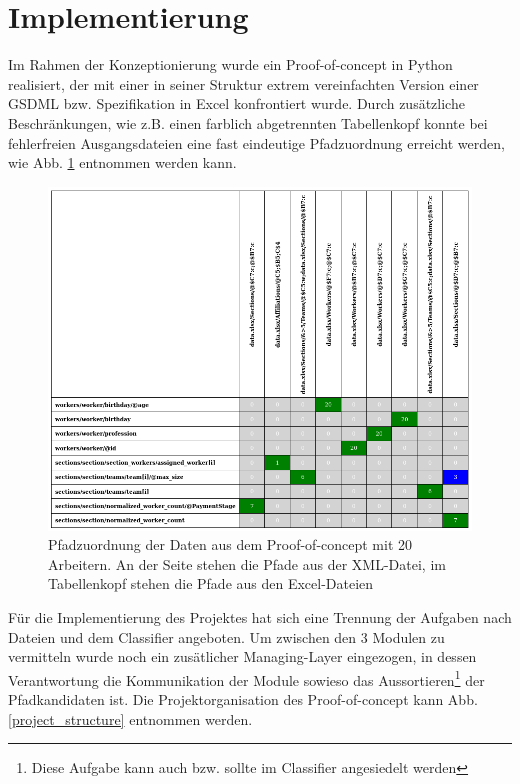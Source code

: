 \documentclass[a4paper,10pt]{article}
\begin{document}
\section{Implementierung}
Im Rahmen der Konzeptionierung wurde ein Proof-of-concept in Python realisiert, der mit einer in seiner Struktur
extrem vereinfachten Version einer GSDML bzw. Spezifikation in Excel konfrontiert wurde. Durch zusätzliche
Beschränkungen, wie z.B. einen farblich abgetrennten Tabellenkopf konnte bei fehlerfreien Ausgangsdateien eine
fast eindeutige Pfadzuordnung erreicht werden, wie Abb. \ref{classifier_ex} entnommen werden kann.
\begin{figure}[h]
 \centering
 \includegraphics[scale=0.25]{example_table}
 \caption{Pfadzuordnung der Daten aus dem Proof-of-concept mit 20 Arbeitern. An der Seite stehen die Pfade aus
          der XML-Datei, im Tabellenkopf stehen die Pfade aus den Excel-Dateien}
 \label{classifier_ex}
\end{figure}
Für die Implementierung des Projektes hat sich eine Trennung der Aufgaben nach Dateien und dem Classifier angeboten.
Um zwischen den 3 Modulen zu vermitteln wurde noch ein zusätlicher Managing-Layer eingezogen, in dessen Verantwortung
die Kommunikation der Module sowieso das Aussortieren\footnote{Diese Aufgabe kann auch bzw. sollte im Classifier
angesiedelt werden} der Pfadkandidaten ist. Die Projektorganisation des Proof-of-concept kann Abb.
\ref{project_structure} entnommen werden.
\end{document}
